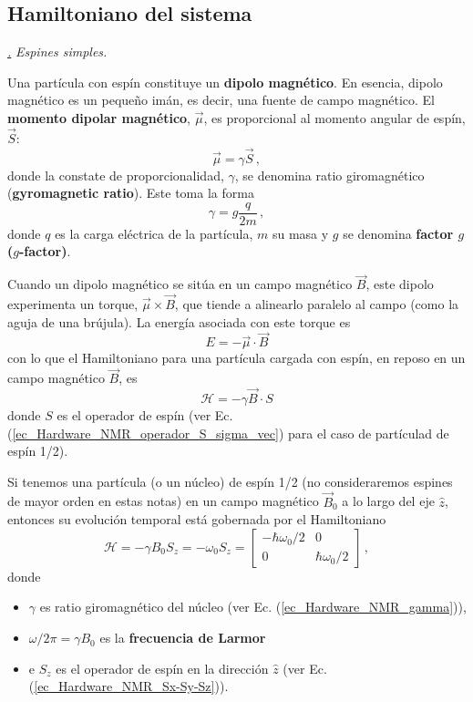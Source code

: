 \documentclass[a4paper,11pt]{book} %
\numberwithin{equation}{chapter}
\def\subsubiContadorIt{\par\addtocounter{subsubsection}{1}\underline{\it\thesubsubsection.}\hskip0.5cm \setcounter{subsubsubsectionIt}{0}}
\newcommand{\SubsubiIt}[1]{
		\subsubiContadorIt \textit{#1}
	}
\newcounter{subsubsubsectionIt}[subsubsection]
\begin{document}
		\subsection{Hamiltoniano del sistema} \label{sec_subsub_Harware_NMR_H_sys}


			\SubsubiIt{Espines simples.} 

Una partícula con espín constituye un \textbf{dipolo magnético}. En esencia, dipolo magnético es un pequeño imán, es decir, una fuente de campo magnético. El \textbf{momento dipolar magnético}, $\vec{\mu}$, es proporcional al momento angular de espín, $\vec{S}$:
	\begin{equation} \label{ec_Hardware_NMR_mu}
	\vec{\mu} = \gamma \vec{S}\, ,
	\end{equation}
donde la constate de proporcionalidad, $\gamma$, se denomina ratio giromagnético (\textbf{gyromagnetic ratio}). Este toma la forma
	\begin{equation} \label{ec_Hardware_NMR_gamma}
	\gamma = g \frac{q}{2m} \, ,
	\end{equation}
donde $q$ es la carga eléctrica de la partícula, $m$ su masa y $g$ se denomina \textbf{factor $g$ ($g$-factor)}. 

Cuando un dipolo magnético se sitúa en un campo magnético $\vec{B}$, este dipolo experimenta un torque, $\vec{\mu} \times \vec{B}$, que tiende a alinearlo paralelo al campo (como la aguja de una brújula). La energía asociada con este torque es
	\begin{equation}
		E = - \vec{\mu} \cdot \vec{B}
		\end{equation}	
con lo que el Hamiltoniano para una partícula cargada con espín, en reposo en un campo magnético $\vec{B}$, es
	\begin{equation}
	\mathcal{H} = - \gamma \vec{B} \cdot S
	\end{equation}
donde $S$ es el operador de espín (ver Ec. (\ref{ec_Hardware_NMR_operador_S_sigma_vec}) para el caso de partículad de espín 1/2).

Si tenemos una partícula (o un núcleo) de espín 1/2 (no consideraremos espines de mayor orden en estas notas) en un campo magnético $\vec{B}_0$ a lo largo del eje $\hat{z}$, entonces su evolución temporal está gobernada por el Hamiltoniano
	\begin{equation} \label{ec_Hardware_NMR_H_sys_1}
	\boxed{\mathcal{H} = -  \gamma B_0 S_z = - \omega_0 S_z = 
	\begin{bmatrix}
	- \hbar \omega_0/2  & 0 \\
	0  &  \hbar \omega_0 /2
	\end{bmatrix}} \, ,
	\end{equation}
donde 
\begin{itemize}
	\item $\gamma$ es ratio giromagnético del núcleo (ver Ec. (\ref{ec_Hardware_NMR_gamma})),
	\item $\omega/2 \pi = \gamma B_0 $ es la \textbf{frecuencia de Larmor}
	\item e $S_z$ es el operador de espín en la dirección $\hat{z}$ (ver Ec. (\ref{ec_Hardware_NMR_Sx-Sy-Sz})).
\end{itemize}
\end{document}
